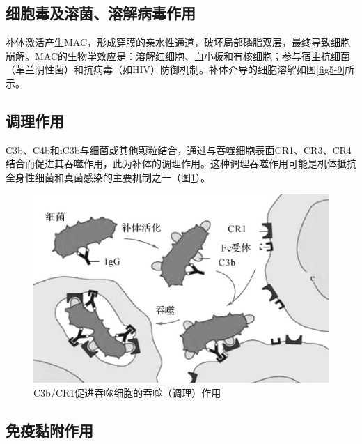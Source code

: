 \subsection{细胞毒及溶菌、溶解病毒作用}

补体激活产生MAC，形成穿膜的亲水性通道，破坏局部磷脂双层，最终导致细胞崩解。MAC的生物学效应是：溶解红细胞、血小板和有核细胞；参与宿主抗细菌（革兰阴性菌）和抗病毒（如HIV）防御机制。补体介导的细胞溶解如图\ref{fig5-9}所示。


\subsection{调理作用}

C3b、C4b和iC3b与细菌或其他颗粒结合，通过与吞噬细胞表面CR1、CR3、CR4结合而促进其吞噬作用，此为补体的调理作用。这种调理吞噬作用可能是机体抵抗全身性细菌和真菌感染的主要机制之一（图\ref{fig5-10}）。

\begin{figure}[!htbp]
 \centering
 \includegraphics{./images/Image00088.jpg}
 \captionsetup{justification=centering}
 \caption{C3b/CR1促进吞噬细胞的吞噬（调理）作用}
 \label{fig5-10}
  \end{figure} 


\subsection{免疫黏附作用}

